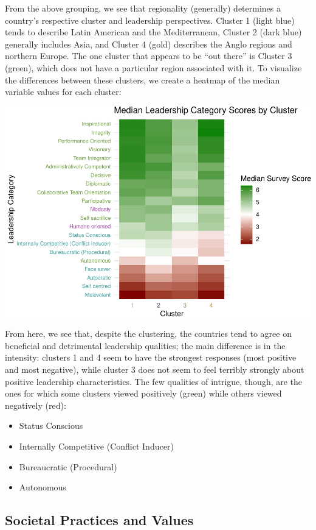 \documentclass[
]{article}
\providecommand{\tightlist}{%
  \setlength{\itemsep}{0pt}\setlength{\parskip}{0pt}}
\begin{document}
From the above grouping, we see that regionality (generally) determines
a country's respective cluster and leadership perspectives. Cluster 1
(light blue) tends to describe Latin American and the Mediterranean,
Cluster 2 (dark blue) generally includes Asia, and Cluster 4 (gold)
describes the Anglo regions and northern Europe. The one cluster that
appears to be ``out there'' is Cluster 3 (green), which does not have a
particular region associated with it. To visualize the differences
between these clusters, we create a heatmap of the median variable
values for each cluster:

\begin{center}\includegraphics[width=0.85\linewidth]{report_files/figure-latex/cluster_values-1} \end{center}

From here, we see that, despite the clustering, the countries tend to
agree on beneficial and detrimental leadership qualities; the main
difference is in the intensity: clusters 1 and 4 seem to have the
strongest responses (most positive and most negative), while cluster 3
does not seem to feel terribly strongly about positive leadership
characteristics. The few qualities of intrigue, though, are the ones for
which some clusters viewed positively (green) while others viewed
negatively (red):

\begin{itemize}
\tightlist
\item
  Status Conscious
\item
  Internally Competitive (Conflict Inducer)
\item
  Bureaucratic (Procedural)
\item
  Autonomous
\end{itemize}

\hypertarget{societal-practices-and-values}{%
\subsection{Societal Practices and
Values}\label{societal-practices-and-values}}
\end{document}
